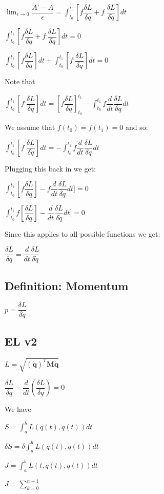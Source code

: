 \(\lim_{\epsilon \rightarrow 0} \dfrac{A’-A}{\epsilon }=\int_{t_0}^{t_1}[f\dfrac{\delta L}{\delta q}+f^.\dfrac{\delta L}{\delta \dot q}]dt\)

\(\int_{t_0}^{t_1}[f\dfrac{\delta L}{\delta q}+f^.\dfrac{\delta L}{\delta \dot q}]dt=0\)

\(\int_{t_0}^{t_1}[f\dfrac{\delta L}{\delta q}]dt +\int_{t_0}^{t_1}[f^.\dfrac{\delta L}{\delta \dot q}]dt=0\)

Note that

\(\int_{t_0}^{t_1}[f^.\dfrac{\delta L}{\delta \dot q}]dt=[f\dfrac{\delta L}{\delta \dot q}]_{t_0}^{t_1}-\int_{t_0}^{t_1}f \dfrac{d}{dt}\dfrac{\delta L}{\delta \dot q}dt\)

We assume that \(f(t_0)=f(t_1)=0\) and so:

\(\int_{t_0}^{t_1}[f^.\dfrac{\delta L}{\delta \dot q}]dt=-\int_{t_0}^{t_1}f \dfrac{d}{dt}\dfrac{\delta L}{\delta \dot q}dt\)

Plugging this back in we get:

\(\int_{t_0}^{t_1}[f\dfrac{\delta L}{\delta q}]-f \dfrac{d}{dt}\dfrac{\delta L}{\delta \dot q}dt]=0\)

\(\int_{t_0}^{t_1}f[\dfrac{\delta L}{\delta q}]-\dfrac{d}{dt}\dfrac{\delta L}{\delta \dot q}dt]=0\)

Since this applies to all possible functions we get:

\(\dfrac{\delta L}{\delta q}=\dfrac{d}{dt}\dfrac{\delta L}{\delta \dot q}\)

\subsection{Definition: Momentum}

\(p=\dfrac{\delta L}{\delta \dot q}\)

\subsection{EL v2}
\(L=\sqrt {(\mathbf {\dot q})^T\mathbf M\mathbf {\dot q}}\)

\(\dfrac{\delta L}{\delta q}- \dfrac{d}{dt}(\dfrac{\delta L}{\delta \dot q})=0\)

We have

\(S=\int_a^b L(q(t), \dot q(t))dt \)

\(\delta S=\delta \int_a^b L(q(t), \dot q(t))dt \)

\(J=\int_a^b L(t,q(t), \dot q(t)) dt\)

\(J=\sum_{k=0}^{n-1}\)


